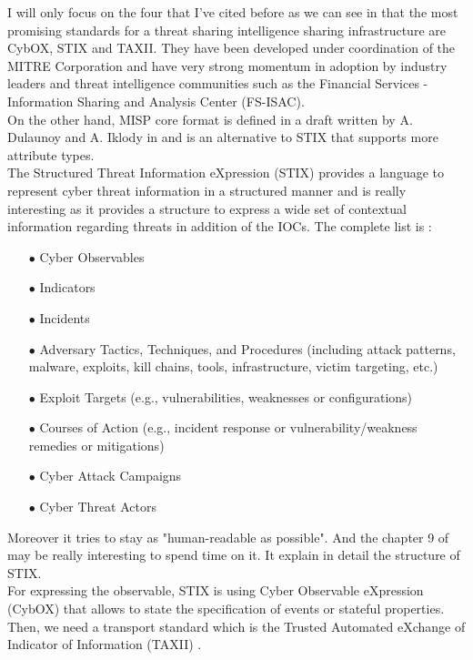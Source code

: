 \documentclass{eplmastersthesis}
\begin{document}
I will only focus on the four that I've cited before as we can see in \cite{fransen2015cyber, sauerwein2017threat} that the most promising standards for a threat sharing intelligence sharing infrastructure are CybOX, STIX and TAXII. They have been developed under coordination of the MITRE Corporation and have very strong momentum in adoption by industry leaders and threat intelligence communities such as the Financial Services - Information Sharing and Analysis Center (FS-ISAC).\\
On the other hand, MISP core format is defined in a draft written by A. Dulaunoy and A. Iklody in \cite{MispDraft} and is an alternative to STIX that supports more attribute types.\\
The  Structured Threat Information eXpression (STIX) \cite{barnum2012standardizing} provides a language to represent cyber threat information in a structured manner and is really interesting as it provides a structure to express a wide set of contextual information regarding threats in addition of the IOCs. The complete list is :

\begin{itemize}
\item[$\bullet$] Cyber Observables
\item[$\bullet$] Indicators
\item[$\bullet$] Incidents
\item[$\bullet$] Adversary Tactics, Techniques, and Procedures (including attack patterns, malware, exploits, kill
chains, tools, infrastructure, victim targeting, etc.)
\item[$\bullet$] Exploit Targets (e.g., vulnerabilities, weaknesses or configurations)
\item[$\bullet$] Courses of Action (e.g., incident response or vulnerability/weakness remedies or mitigations)
\item[$\bullet$] Cyber Attack Campaigns
\item[$\bullet$] Cyber Threat Actors
\end{itemize}

 Moreover it tries to stay as "human-readable as possible". And the chapter 9 of \cite{barnum2012standardizing} may be really interesting to spend time on it. It explain in detail the structure of STIX.\\
 For expressing the observable, STIX is using Cyber Observable eXpression (CybOX)\cite{barnum2012cybox} that allows to state the specification of events or stateful properties.
Then, we need a transport standard which is the Trusted Automated eXchange of Indicator of Information (TAXII) \cite{connolly2014trusted} .
\end{document}
